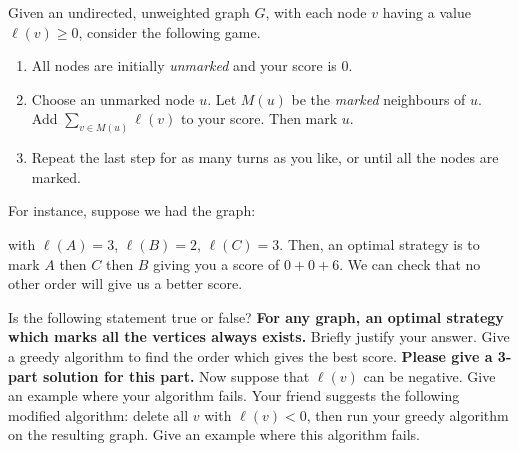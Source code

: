 \documentclass{article}
\begin{document}
Given an undirected, unweighted graph $G$, with each node $v$ having a value $\ell(v) \geq 0$, consider the following game.
\begin{enumerate}
\item
All nodes are initially \emph{unmarked} and your score is $0$.
\item Choose an unmarked node $u$. Let $M(u)$ be the \emph{marked} neighbours of $u$.
Add $\sum_{v \in M(u)} \ell(v)$ to your score. Then mark $u$.
\item Repeat the last step for as many turns as you like, or until all the nodes are marked.
\end{enumerate}

For instance, suppose we had the graph:
\begin{figure}[h!]
\centering
{}
\end{figure}

\noindent with $\ell(A) = 3$, $\ell(B) = 2$, $\ell(C) = 3$.
Then, an optimal strategy is to mark
$A$
then $C$
then $B$
giving you a score of
$0+0+6$.
We can check that no other order will give us a better score.

\begin{subparts}
\subpart Is the following statement true or false? \textbf{For any graph, an optimal strategy which marks all the vertices always exists.} Briefly justify your answer.
\subpart Give a greedy algorithm to find the order which gives the best score. \textbf{Please give a 3-part solution for this part.}
\subpart Now suppose that $\ell(v)$ can be negative. Give an example where your algorithm fails.
\subpart Your friend suggests the following modified algorithm: delete all $v$ with $\ell(v) < 0$,
then run your greedy algorithm on the resulting graph. Give an example where this algorithm fails.
\end{subparts}
\end{document}
